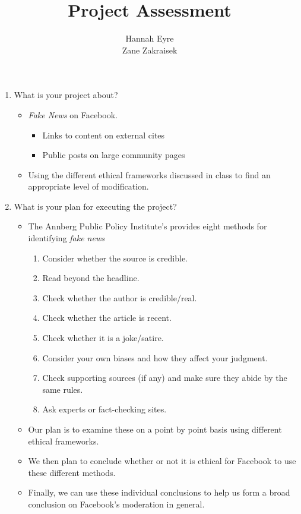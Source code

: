 \documentclass[11pt]{article}
\title{Project Assessment}
\author{Hannah Eyre\\
	Zane Zakraisek}
\begin{document}
\maketitle



\begin{enumerate}

  \item What is your project about?
    \begin{itemize}
      \item \textit{Fake News} on Facebook.
        \begin{itemize}
          \item Links to content on external cites
          \item Public posts on large community pages
        \end{itemize}
      \item Using the different ethical frameworks discussed in class to find an appropriate level of modification.
    \end{itemize}

  \item What is your plan for executing the project?
    \begin{itemize}
      \item The Annberg Public Policy Institute's provides eight methods for identifying \textit{fake news}
        \begin{enumerate}
          \item Consider whether the source is credible.
          \item Read beyond the headline.
          \item Check whether the author is credible/real.
          \item Check whether the article is recent.
          \item Check whether it is a joke/satire.
          \item Consider your own biases and how they affect your judgment.
          \item Check supporting sources (if any) and make sure they abide by the same rules.
          \item Ask experts or fact-checking sites.
        \end{enumerate}
      \item Our plan is to examine these on a point by point basis using different ethical frameworks.
      \item We then plan to conclude whether or not it is ethical for Facebook to use these different methods.
      \item Finally, we can use these individual conclusions to help us form a broad conclusion on Facebook's moderation in general.
    \end{itemize}


\end{enumerate}
\end{document}
